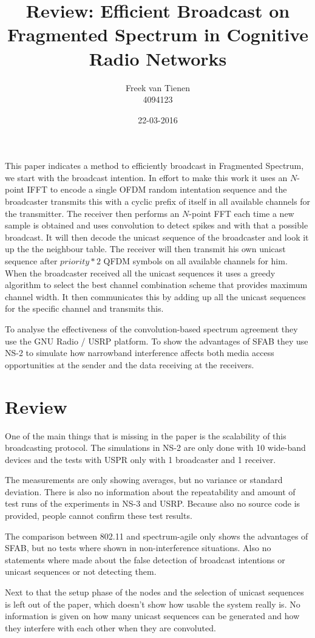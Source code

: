 \documentclass[]{article}
\begin{document}


\title{Review: Efficient Broadcast on Fragmented Spectrum in Cognitive Radio Networks}
\author{Freek van Tienen \\ 4094123}
\date{22-03-2016}
\maketitle

This paper\cite{7218377} indicates a method to efficiently broadcast in Fragmented Spectrum, we start with the broadcast intention.
In effort to make this work it uses an $N$-point IFFT to encode a single OFDM random intentation sequence and the broadcaster transmits this with a cyclic prefix of itself in all available channels for the transmitter.
The receiver then performs an $N$-point FFT each time a new sample is obtained and uses convolution to detect spikes and with that a possible broadcast.
It will then decode the unicast sequence of the broadcaster and look it up the the neighbour table.
The receiver will then transmit his own unicast sequence after $priority * 2$ QFDM symbols on all available channels for him.
When the broadcaster received all the unicast sequences it  uses a greedy algorithm to select the best channel combination scheme that provides maximum channel width.
It then communicates this by adding up all the unicast sequences for the specific channel and transmits this.

To analyse the effectiveness of the convolution-based spectrum agreement they use the GNU Radio / USRP platform.
To show the advantages of SFAB they use NS-2 to simulate how narrowband interference affects both media access opportunities at the sender and the data receiving at the receivers.

\section*{Review}
One of the main things that is missing in the paper is the scalability of this broadcasting protocol.
The simulations in NS-2 are only done with 10 wide-band devices and the tests with USPR only with 1 broadcaster and 1 receiver. 

The measurements are only showing averages, but no variance or standard deviation.
There is also no information about the repeatability and amount of test runs of the experiments in NS-3 and USRP.
Because also no source code is provided, people cannot confirm these test results.

The comparison between 802.11 and spectrum-agile only shows the advantages of SFAB, but no tests where shown in non-interference situations.
Also no statements where made about the false detection of broadcast intentions or unicast sequences or not detecting them.

Next to that the setup phase of the nodes and the selection of unicast sequences is left out of the paper, which doesn't show how usable the system really is.
No information is given on how many unicast sequences can be generated and how they interfere with each other when they are convoluted.


\end{document}
